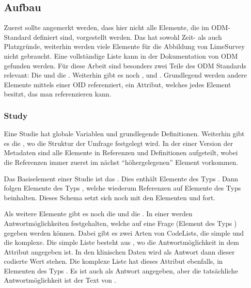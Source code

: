 \subsection{Aufbau}

Zuerst sollte angemerkt werden, dass hier nicht alle Elemente, die im ODM-Standard definiert sind, vorgestellt werden. Das hat sowohl Zeit- als auch Platzgründe, weiterhin werden viele Elemente für die Abbildung von LimeSurvey nicht gebraucht.
Eine vollständige Liste kann in der Dokumentation von ODM gefunden werden. %
Für diese Arbeit sind besonders zwei Teile des ODM Standards relevant: Die  und die .
Weiterhin gibt es noch ,  und .
Grundlegend werden andere Elemente mittels einer OID referenziert, ein Attribut, welches jedes Element besitzt, das man referenzieren kann.

\subsubsection{Study}

Eine Studie hat globale Variablen und grundlegende Definitionen.
Weiterhin gibt es die , wo die Struktur der Umfrage festgelegt wird.
In der einer Version der Metadaten sind alle Elemente in Referenzen und Definitionen aufgeteilt, wobei die Referenzen immer zuerst im nächst \enquote{höhergelegenen} Element vorkommen.

Das Basiselement einer Studie ist das .
Dies enthält Elemente des Typs .
Dann folgen Elemente des Typs , welche wiederum Referenzen auf Elemente des Typs  beinhalten.
Dieses Schema setzt sich noch mit den Elementen  und  fort.

Als weitere Elemente gibt es noch die  und die .
In einer  werden Antwortmöglichkeiten festgehalten, welche auf eine Frage (Element des Typs ) gegeben werden können.
Dabei gibt es zwei Arten von CodeLists, die simple und die komplexe.
Die simple Liste besteht aus , wo die Antwortmöglichkeit in dem Attribut  angegeben ist.
In den klinischen Daten wird als Antwort dann dieser codierte Wert stehen.
Die komplexe Liste hat dieses Attribut ebenfalls, in Elementen des Typs . Es ist auch als Antwort angegeben, aber die tatsächliche Antwortmöglichkeit ist der Text von .


